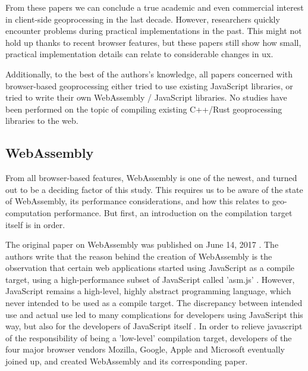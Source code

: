 
From these papers we can conclude a true academic and even commercial interest in client-side geoprocessing in the last decade. However, researchers quickly encounter problems during practical implementations in the past. This might not hold up thanks to recent browser features, but these papers still show how small, practical implementation details can relate to considerable changes in \ac{ux}. 

Additionally, to the best of the authors's knowledge, all papers concerned with browser-based geoprocessing either tried to use existing JavaScript libraries, or tried to write their own WebAssembly / JavaScript libraries. No studies have been performed on the topic of compiling existing C++/Rust geoprocessing libraries to the web. 




\newpage
\subsection{WebAssembly}

From all browser-based features, WebAssembly is one of the newest, and turned out to be a deciding factor of this study. This requires us to be aware of the state of WebAssembly, its performance considerations, and how this relates to geo-computation performance. But first, an introduction on the compilation target itself is in order.

The original paper on WebAssembly was published on June 14, 2017 \cite{haas_bringing_2017}. The authors write that the reason behind the creation of WebAssembly is the observation that certain web applications started using JavaScript as a compile target, using a high-performance subset of JavaScript called 'asm.js' \cite{mozilla_asmjs_2013}. However, JavaScript remains a high-level, highly abstract programming language, which never intended to be used as a compile target. The discrepancy between intended use and actual use led to many complications for developers using JavaScript this way, but also for the developers of JavaScript itself \cite{haas_bringing_2017}. 
In order to relieve javascript of the responsibility of being a 'low-level' compilation target, developers of the four major browser vendors Mozilla, Google, Apple and Microsoft eventually joined up, and created WebAssembly and its corresponding paper.

